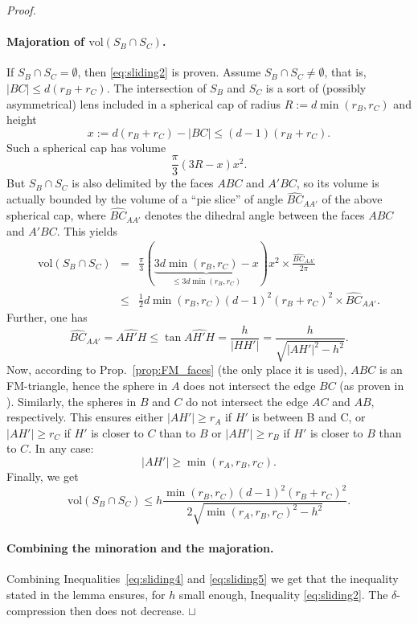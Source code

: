 \documentclass[11pt]{article}
\newenvironment{proof}{\noindent \emph{Proof. }}{\hfill \hbox{\rlap{$\sqcap$}$\sqcup$}\\}
\begin{document}
\begin{proof}
\paragraph{Majoration of $\textrm{vol}(S_B\cap S_C)$.}
If $S_B\cap S_C=\emptyset$, then \eqref{eq:sliding2} is proven.
Assume $S_B\cap S_C\neq\emptyset$, that is, $|BC|\leq d(r_B+r_C)$.
The intersection of $S_B$ and $S_C$ is a sort of (possibly asymmetrical) lens included in a spherical cap of radius $R:=d\min(r_B,r_C)$ and height
\[
x:=d(r_B+r_C)-|BC|\leq (d-1)(r_B+r_C).
\]
Such a spherical cap has volume
\[
\frac{\pi}{3}(3R-x)x^2.
\]
But $S_B\cap S_C$ is also delimited by the faces $ABC$ and $A'BC$, so its volume is actually bounded by the volume of a ``pie slice'' of angle $\widehat{BC}_{AA'}$ of the above spherical cap, where $\widehat{BC}_{AA'}$ denotes the dihedral angle between the faces $ABC$ and $A'BC$.
This yields
\begin{eqnarray*}
\textrm{vol}(S_B\cap S_C)
&=& \frac{\pi}{3}(\underbrace{3d\min(r_B,r_C)-x}_{\leq 3d\min(r_B,r_C)})x^2\times\frac{\widehat{BC}_{AA'}}{2\pi}\\
&\leq& \frac{1}{2}d\min(r_B,r_C)(d-1)^2(r_B+r_C)^2\times\widehat{BC}_{AA'}.
\end{eqnarray*}
Further, one has
\[
\widehat{BC}_{AA'}=\widehat{AH'H}\leq\tan\widehat{AH'H}=\frac{h}{|HH'|}=\frac{h}{\sqrt{|AH'|^2-h^2}}.
\]
Now, according to Prop.~\ref{prop:FM_faces} (the only place it is used), $ABC$ is an FM-triangle, hence the sphere in $A$ does not intersect the edge $BC$ (as proven in \cite{FM58}).
Similarly, the spheres in $B$ and $C$ do not intersect the edge $AC$ and $AB$, respectively.
This ensures either $|AH'|\geq r_A$ if $H'$ is between B and C,
or $|AH'|\geq r_C$ if $H'$ is closer to $C$ than to $B$
or $|AH'|\geq r_B$ if $H'$ is closer to $B$ than to $C$.
In any case:
\[
|AH'|\geq\min(r_A,r_B,r_C).
\]
Finally, we get
\begin{equation}
\label{eq:sliding5}
\textrm{vol}(S_B\cap S_C)\leq h\frac{\min(r_B,r_C)(d-1)^2(r_B+r_C)^2}{2\sqrt{\min(r_A,r_B,r_C)^2-h^2}}.
\end{equation}

\paragraph{Combining the minoration and the majoration.}
Combining Inequalities~\eqref{eq:sliding4} and \eqref{eq:sliding5} we get that the inequality stated in the lemma ensures, for $h$ small enough, Inequality \eqref{eq:sliding2}.
The $\delta$-compression then does not decrease.
\end{proof}
\end{document}
